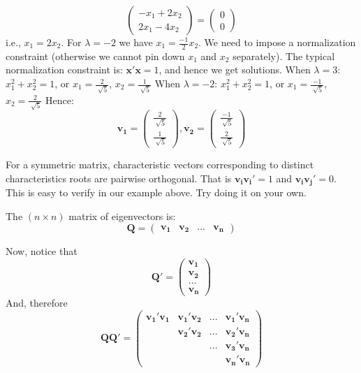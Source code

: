 \documentclass[11pt]{article}
\theoremstyle{definition}
\theoremstyle{remark}
\begin{document}
\begin{itemize}
$$
\begin{pmatrix}
-x_1 + 2x_2 \\
2x_1 - 4x_2
\end{pmatrix}
=
\begin{pmatrix}
0 \\
0
\end{pmatrix}
$$
i.e., $x_1 = 2x_2$. For $\lambda = -2$ we have $x_1 = \frac{-1}{2}x_2$. We need to impose a normalization constraint (otherwise we cannot pin down $x_1$ and $x_2$ separately). The typical normalization constraint is: $\mathbf{x'x}=1$, and hence we get solutions.
\newline
\newline
When $\lambda = 3$: $x_1^2 + x_2^2 = 1$, or $x_1 = \frac{2}{\sqrt[]{5}}$, $x_2 = \frac{1}{\sqrt[]{5}}$ 
\newline
\newline
When $\lambda = -2$: $x_1^2 + x_2^2 = 1$, or $x_1 = \frac{-1}{\sqrt[]{5}}$, $x_2 = \frac{2}{\sqrt[]{5}}$ 
\newline
\newline
Hence:
$$
\mathbf{v_1} =
\begin{pmatrix}
\frac{2}{\sqrt[]{5}} \\
\frac{1}{\sqrt[]{5}}
\end{pmatrix}
,  
\mathbf{v_2} =
\begin{pmatrix}
\frac{-1}{\sqrt[]{5}} \\
\frac{2}{\sqrt[]{5}}
\end{pmatrix}
$$

For a symmetric matrix, characteristic vectors corresponding to distinct characteristics roots are pairwise orthogonal. That is $\mathbf{v_iv_i'} = 1$ and $\mathbf{v_iv_j'} = 0$. This is easy to verify in our example above. Try doing it on your own.

The $(n \times n)$ matrix of eigenvectors is:
$$
\mathbf{Q} = 
\begin{pmatrix}
\mathbf{v_1}&\mathbf{v_2}&...&\mathbf{v_n}
\end{pmatrix}
$$

Now, notice that 
$$
\mathbf{Q'} = 
\begin{pmatrix}
\mathbf{v_1} \\
\mathbf{v_2} \\
... \\
\mathbf{v_n}
\end{pmatrix}
$$
And, therefore 
$$
\mathbf{QQ'} = 
\begin{pmatrix}
\mathbf{v_1'v_1}&\mathbf{v_1'v_2}&...&\mathbf{v_1'v_n} \\
 &\mathbf{v_2'v_2}&...&\mathbf{v_2'v_n} \\
 & & ... & \mathbf{v_3'v_n} \\
 & & & \mathbf{v_n'v_n}
\end{pmatrix}
$$


\end{itemize}
\end{document}
